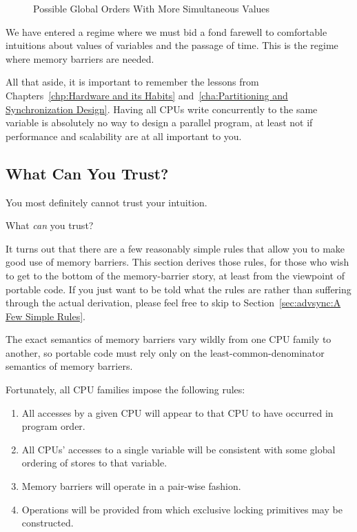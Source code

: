 \begin{figure}[htb]
\centering
{}
\caption{Possible Global Orders With More Simultaneous Values}
\label{fig:advsync:Possible Global Orders With More Simultaneous Values}
\end{figure}

We have entered a regime where we must bid a fond farewell to
comfortable intuitions about values of variables and the passage of time.
This is the regime where memory barriers are needed.

All that aside, it is important to remember the lessons from
Chapters~\ref{chp:Hardware and its Habits}
and~\ref{cha:Partitioning and Synchronization Design}.
Having all CPUs write concurrently to the same variable
is absolutely no way to design a parallel program, at least
not if performance and scalability are at all important to you.

\subsection{What Can You Trust?}
\label{sec:advsync:What Can You Trust?}

You most definitely cannot trust your intuition.

What \emph{can} you trust?

It turns out that there are a few reasonably simple rules that
allow you to make good use of memory barriers.
This section derives those rules, for those who wish to get
to the bottom of the memory-barrier story, at least from the viewpoint
of portable code.
If you just want to be told what the rules are rather than suffering
through the actual derivation,
please feel free to skip to Section~\ref{sec:advsync:A Few Simple Rules}.

The exact semantics of memory barriers vary wildly from one CPU family to
another, so portable code must rely only on the least-common-denominator
semantics of memory barriers.

Fortunately, all CPU families impose the following rules:
\begin{enumerate}
\item	All accesses by a given CPU will appear to that CPU to have
	occurred in program order.
\item	All CPUs' accesses to a single variable will be consistent with
	some global ordering of stores to that variable.
\item	Memory barriers will operate in a pair-wise fashion.
\item	Operations will be provided from which exclusive locking
	primitives may be constructed.
\end{enumerate}

